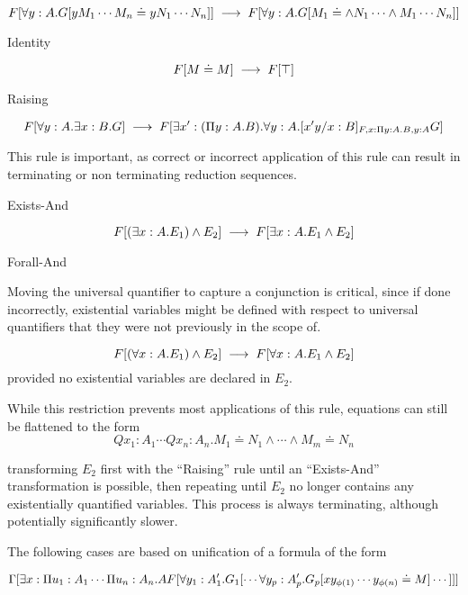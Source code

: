 \[
F[\forall y : A . G[y M_1 \cdots M_n \doteq y N_1 \cdots N_n  ]]
\;\longrightarrow\;
F[\forall y : A . G[ M_1 \doteq \wedge N_1 \cdots \wedge M_1 \cdots N_n ]]
\]

\begin{tcase}
Identity
\end{tcase}

\[
F[M \doteq M] 
\;\longrightarrow\;
F[\top]
\]

\begin{tcase}
Raising
\end{tcase}

\[
F[\forall y : A . \exists x : B . G]
\;\longrightarrow\;
F[\exists x' : (\Pi y : A . B) . \forall y : A . [x' y / x : B]_{F, x : \Pi y : A . B , y : A} G]
\]

This rule is important, as correct or 
incorrect application of this rule can result in 
terminating or non terminating reduction sequences.

\begin{tcase}
Exists-And
\end{tcase}

\[
F[(\exists x : A . E_1) \wedge E_2]
\;\longrightarrow\;
F[\exists x : A . E_1 \wedge E_2]
\]

\begin{tcase}
Forall-And
\end{tcase}


Moving the universal quantifier to
capture a conjunction is critical, since
if done incorrectly, existential variables might be 
defined with respect to universal quantifiers that they
were not previously in the scope of.

\[
F[(\forall x : A . E_1) \wedge E_2]
\;\longrightarrow\;
F[\forall x : A . E_1 \wedge E_2]
\]
provided no existential variables are declared in $E_2$.

While this restriction prevents most applications of this rule, 
equations can still be flattened to the form
\[
Qx_1:A_1\cdots Qx_n : A_n . M_1 \doteq N_1 \wedge \cdots \wedge M_m \doteq N_n
\]

transforming $E_2$ first with the ``Raising'' rule until 
an ``Exists-And'' transformation is possible, then repeating  
until $E_2$ no longer contains any existentially 
quantified variables.  This process is always terminating,
although potentially significantly slower.

The following cases are based on unification 
of a formula of the form

\[
\Gamma[
\exists x : \Pi u_1 : A_1 \cdots \Pi u_n : A_n . A 
\\
F[\forall y_1 : A'_1 . G_1 
[ \cdots \forall y_p : A'_p . G_p 
[ x y_{\phi(1)} \cdots y_{\phi(n)} \doteq M ]
\cdots
]]]
\]

